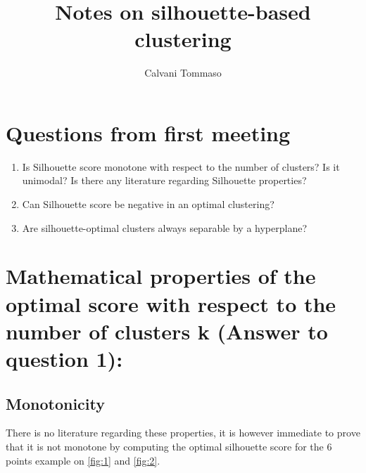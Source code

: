 \documentclass{article}
\title{Notes on silhouette-based clustering}
\author{Calvani Tommaso}
\begin{document}
\maketitle


\section*{Questions from first meeting}

\begin{enumerate}
\item Is Silhouette score monotone with respect to the number of clusters? Is it unimodal? Is there any literature regarding Silhouette properties?
\item Can Silhouette score be negative in an optimal clustering?
\item Are silhouette-optimal clusters always separable by a hyperplane?
\end{enumerate}

\section{Mathematical properties of the optimal score with respect to the number of clusters k (Answer to question 1):}

\subsection*{Monotonicity}

There is no literature regarding these properties, it is however immediate to prove that it is not monotone by computing the optimal silhouette score for the 6 points example on \ref{fig:1} and \ref{fig:2}.
\end{document}
